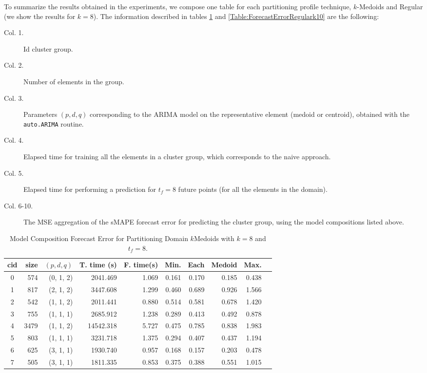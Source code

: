 To summarize the results obtained in the experiments, we compose one table for each partitioning profile technique, $k$-Medoids and Regular (we show the results for $k=8$). The information described in tables \ref{Table:ForecastErrorkMedoidsk8} and \ref{Table:ForecastErrorRegulark10} are the following:

\begin{description}
    \item[Col. 1.] Id cluster group.
    \item[Col. 2.] Number of elements in the group.
    \item[Col. 3.] Parameters $(p, d, q)$ corresponding to the ARIMA model on the representative element (medoid or centroid), obtained with the \texttt{auto.ARIMA} routine.
    \item[Col. 4.] Elapsed time for training all the elements in a cluster group, which corresponds to the naive approach.
    \item[Col. 5.] Elapsed time for performing a prediction for $t_{f}=8$ future points (for all the elements in the domain).
    \item[Col. 6-10.] The MSE aggregation of the sMAPE forecast error for predicting the cluster group, using the model compositions listed above.
\end{description}

\begin{table}[h]
	\centering
	\small
	\begin{tabular}{|c|r|r|r|r|r|r|r|r|r|}
        \hline
        cid & size & $(p, d, q)$ & T. time (s) & F. time(s) & Min. & Each & \cellcolor{red!20}Medoid & Max. \\
        \hline
        0 &  574 & (0, 1, 2) &  2041.469   & 1.069   & 0.161  & 0.170  & \cellcolor{red!20}0.185 & 0.438  \\
        1 &  817 & (2, 1, 2) &  3447.608   & 1.299   & 0.460  & 0.689  & \cellcolor{red!20}0.926 & 1.566  \\
        2 &  542 & (1, 1, 2) &  2011.441   & 0.880   & 0.514  & 0.581  & \cellcolor{red!20}0.678 & 1.420  \\
        3 &  755 & (1, 1, 1) &  2685.912   & 1.238   & 0.289  & 0.413  & \cellcolor{red!20}0.492 & 0.878  \\
        4 & 3479 & (1, 1, 2) & 14542.318   & 5.727   & 0.475  & 0.785  & \cellcolor{red!20}0.838 & 1.983  \\
        5 &  803 & (1, 1, 1) &  3231.718   & 1.375   & 0.294  & 0.407  & \cellcolor{red!20}0.437 & 1.194  \\
        6 &  625 & (3, 1, 1) &  1930.740   & 0.957   & 0.168  & 0.157  & \cellcolor{red!20}0.203 & 0.478  \\
        7 &  505 & (3, 1, 1) &  1811.335   & 0.853   & 0.375  & 0.388  & \cellcolor{red!20}0.551 & 1.015  \\ \hline      
	\end{tabular}
	\caption{Model Composition Forecast Error for Partitioning Domain $k$Medoids with $k=8$ and $t_{f}=8$.}
	\label{Table:ForecastErrorkMedoidsk8}
\end{table}

